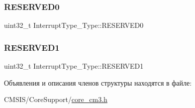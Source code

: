 \subsubsection{\texorpdfstring{RESERVED0}{RESERVED0}}
{\footnotesize\ttfamily uint32\+\_\+t Interrupt\+Type\+\_\+\+Type\+::\+R\+E\+S\+E\+R\+V\+E\+D0}

\mbox{\label{struct_interrupt_type___type_a45933eb981309d50f943ec3af67f17be}} 
\subsubsection{\texorpdfstring{RESERVED1}{RESERVED1}}
{\footnotesize\ttfamily uint32\+\_\+t Interrupt\+Type\+\_\+\+Type\+::\+R\+E\+S\+E\+R\+V\+E\+D1}



Объявления и описания членов структуры находятся в файле\+:\begin{DoxyCompactItemize}
\item 
C\+M\+S\+I\+S/\+Core\+Support/\mbox{\hyperlink{core__cm3_8h}{core\+\_\+cm3.\+h}}\end{DoxyCompactItemize}
